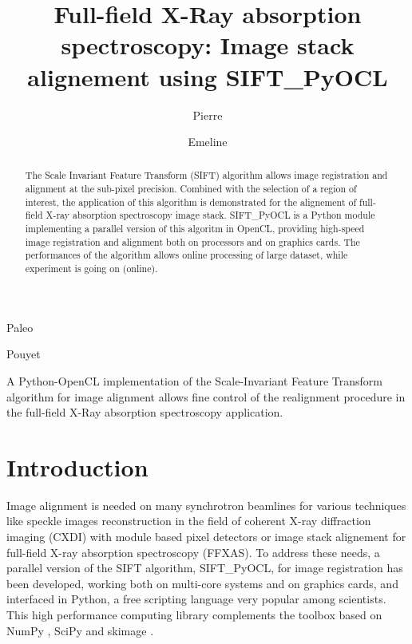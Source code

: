 \documentclass[preprint]{iucr}
\begin{document}
\title{Full-field X-Ray absorption spectroscopy: Image stack
alignement using SIFT\_PyOCL}

    \author[a]{Pierre}{Paleo}
    \author[a]{Emeline}{Pouyet}

\maketitle

\begin{synopsis}
A Python-OpenCL implementation of the  Scale-Invariant Feature Transform
algorithm for image alignment allows fine control of the realignment procedure
in the full-field X-Ray absorption spectroscopy application.
\end{synopsis}

\begin{abstract}
The Scale Invariant Feature Transform (SIFT) algorithm allows image
registration and alignment at the sub-pixel precision. Combined
with the selection of a region of interest, the application of this algorithm
is demonstrated for the alignement of full-field X-ray absorption spectroscopy
image stack.
SIFT\_PyOCL is a Python module implementing a parallel version of this algoritm
in OpenCL, providing high-speed image registration and alignment both on
processors and on graphics cards. The performances of the algorithm allows
online processing of large dataset, while experiment is going on (online).
\end{abstract}

\section{Introduction}

Image alignment is needed on many synchrotron beamlines for
various techniques like speckle images reconstruction in the field of coherent
X-ray diffraction imaging (CXDI) with module based pixel detectors or image
stack alignement for full-field X-ray absorption spectroscopy (FFXAS).
To address these needs, a parallel version of the SIFT algorithm, SIFT\_PyOCL,
for image registration has been developed, working both 
on multi-core systems and on graphics cards, and interfaced in Python, a free
scripting language very popular among scientists. 
This high performance computing library complements
the toolbox based on NumPy \cite{numpy}, SciPy \cite{scipy} and
skimage \cite{skimage}.
\end{document}
